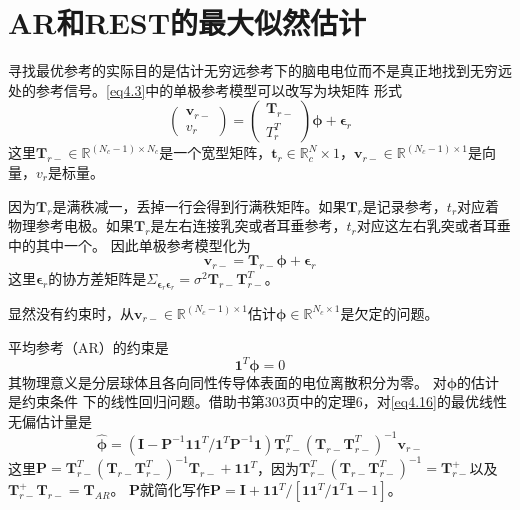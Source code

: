\section{AR和REST的最大似然估计}
寻找最优参考的实际目的是估计无穷远参考下的脑电电位而不是真正地找到无穷远处的参考信号。\eqref{eq4.3}中的单极参考模型可以改写为块矩阵
形式
\begin{equation}\label{eq4.15}
\begin{pmatrix}\mathbf{v}_{r-}\\v_r\end{pmatrix}=\begin{pmatrix}\mathbf{T}_{r-}\\T_r^T\end{pmatrix}\mathbf{\phi}+\mathbf{\epsilon}_r
\end{equation}
这里$\mathbf{T}_{r-}\in\mathbb{R}^{(N_c-1)\times{N_c}}$是一个宽型矩阵，$\mathbf{t}_r\in\mathbb{R}^N_c\times1$，$\mathbf{v}_{r-}\in\mathbb{R}^{(N_c-1)\times1}$是向量，$v_r$是标量。

因为$\mathbf{T}_r$是满秩减一，丢掉一行会得到行满秩矩阵。如果$\mathbf{T}_r$是记录参考，$t_r$对应着物理参考电极。如果$\mathbf{T}_r$是左右连接乳突或者耳垂参考，$t_r$对应这左右乳突或者耳垂中的其中一个。 因此单极参考模型化为
\begin{equation}\label{eq4.16}
\mathbf{v}_{r-}=\mathbf{T}_{r-}\mathbf{\phi}+\mathbf{\epsilon}_r
\end{equation}
这里$\mathbf{\epsilon}_r$的协方差矩阵是$\Sigma_{\mathbf{\epsilon}_r\mathbf{\epsilon}_r}=\sigma^2\mathbf{T}_{r-}\mathbf{T}_{r-}^T$。

显然没有约束时，从$\mathbf{v}_{r-}\in\mathbb{R}^{(N_c-1)\times1}$估计$\mathbf{\phi}\in\mathbb{R}^{N_c\times1}$是欠定的问题。

平均参考（AR）的约束是
\begin{equation}\label{eq4.17}
\mathbf{1}^T\mathbf{\phi}=0
\end{equation}
其物理意义是分层球体且各向同性传导体表面的电位离散积分为零。 对$\mathbf{\phi}$的估计是约束条件
下的线性回归问题。借助书\cite{magnus_matrix_2007}第303页中的定理6，对\eqref{eq4.16}的最优线性无偏估计量是
\begin{equation}\label{eq4.18}
\hat{\mathbf{\phi}}=(\mathbf{I}-\mathbf{P}^{-1}\mathbf{11}^T/{\mathbf{1}^T\mathbf{P}^{-1}\mathbf{1}})\mathbf{T}_{r-}^T(\mathbf{T}_{r-}\mathbf{T}_{r-}^T)^{-1}\mathbf{v}_{r-}
\end{equation}
这里$\mathbf{P}={\mathbf{T}_{r-}^T(\mathbf{T}_{r-}\mathbf{T}_{r-}^T)^{-1}\mathbf{T}_{r-}}+\mathbf{11}^T$，因为$\mathbf{T}_{r-}^T(\mathbf{T}_{r-}\mathbf{T}_{r-}^T)^{-1}=\mathbf{T}_{r-}^+$以及$\mathbf{T}_{r-}^+\mathbf{T}_{r-}=\mathbf{T}_{AR}$。 $\mathbf{P}$就简化写作$\mathbf{P}=\mathbf{I}+\mathbf{11}^T/{[\mathbf{11}^T/{\mathbf{1}^T\mathbf{1}-1}]}$。

